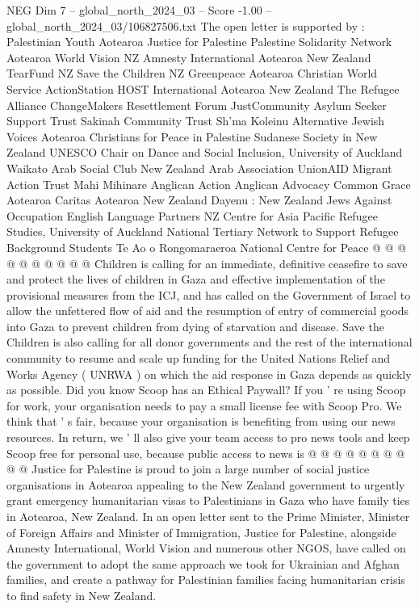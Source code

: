 \begin{textsample}{NEG Dim 7 – global\_north\_2024\_03 – Score -1.00 – global\_north\_2024\_03/106827506.txt}
The open letter is supported by : Palestinian Youth Aotearoa Justice for Palestine Palestine Solidarity Network Aotearoa World Vision NZ Amnesty International Aotearoa New Zealand TearFund NZ Save the Children NZ Greenpeace Aotearoa Christian World Service ActionStation HOST International Aotearoa New Zealand The Refugee Alliance ChangeMakers Resettlement Forum JustCommunity Asylum Seeker Support Trust Sakinah Community Trust Sh'ma Koleinu Alternative Jewish Voices Aotearoa Christians for Peace in Palestine Sudanese Society in New Zealand UNESCO Chair on Dance and Social Inclusion, University of Auckland Waikato Arab Social Club New Zealand Arab Association UnionAID Migrant Action Trust Mahi Mihinare Anglican Action Anglican Advocacy Common Grace Aotearoa Caritas Aotearoa New Zealand Dayenu : New Zealand Jews Against Occupation English Language Partners NZ Centre for Asia Pacific Refugee Studies, University of Auckland National Tertiary Network to Support Refugee Background Students Te Ao o Rongomaraeroa National Centre for Peace @ @ @ @ @ @ @ @ @ @ Children is calling for an immediate, definitive ceasefire to save and protect the lives of children in Gaza and effective implementation of the provisional measures from the ICJ, and has called on the Government of Israel to allow the unfettered flow of aid and the resumption of entry of commercial goods into Gaza to prevent children from dying of starvation and disease.
Save the Children is also calling for all donor governments and the rest of the international community to resume and scale up funding for the United Nations Relief and Works Agency ( UNRWA ) on which the aid response in Gaza depends as quickly as possible.
Did you know Scoop has an Ethical Paywall?
If you ' re using Scoop for work, your organisation needs to pay a small license fee with Scoop Pro.
We think that ' s fair, because your organisation is benefiting from using our news resources.
In return, we ' ll also give your team access to pro news tools and keep Scoop free for personal use, because public access to news is @ @ @ @ @ @ @ @ @ @ Justice for Palestine is proud to join a large number of social justice organisations in Aotearoa appealing to the New Zealand government to urgently grant emergency humanitarian visas to Palestinians in Gaza who have family ties in Aotearoa, New Zealand.
In an open letter sent to the Prime Minister, Minister of Foreign Affairs and Minister of Immigration, Justice for Palestine, alongside Amnesty International, World Vision and numerous other NGOS, have called on the government to adopt the same approach we took for Ukrainian and Afghan families, and create a pathway for Palestinian families facing humanitarian crisis to find safety in New Zealand.

\end{textsample}
